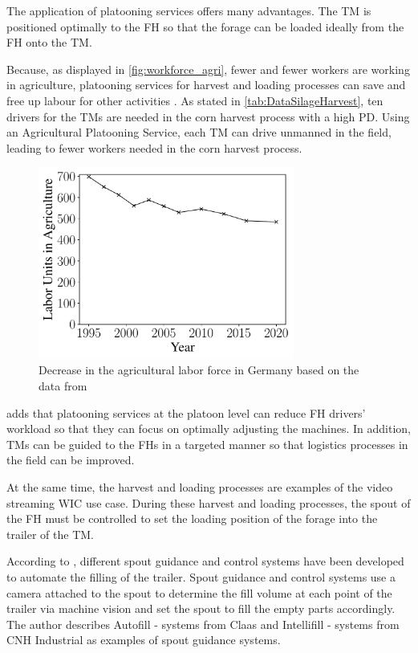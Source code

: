 The application of platooning services offers many advantages.
The \ac{TM} is positioned optimally to the \ac{FH} so that the forage can be loaded ideally from the \ac{FH} onto the \ac{TM}.

Because, as displayed in \autoref{fig:workforce_agri}, fewer and fewer workers are working in agriculture, platooning services for harvest and loading processes can save and free up labour for other activities \cite{liu_automation_2022}. As stated in \autoref{tab:DataSilageHarvest}, ten drivers for the \ac{TM}s are needed in the corn harvest process with a high \ac{PD}. Using an Agricultural Platooning Service, each \ac{TM} can drive unmanned in the field, leading to fewer workers needed in the corn harvest process.

\begin{figure}[H]
   \centering
   \includegraphics[width=0.75\textwidth]{figures/WorkForceAgriculture.pdf}
   \caption{Decrease in the agricultural labor force in Germany based on the data from \cite{bmel2020}}%
   \label{fig:workforce_agri}%
\end{figure}
\textcite{smolnik_5g_2020} adds that platooning services at the platoon level can reduce \ac{FH} drivers' workload so that they can focus on optimally adjusting the machines.
In addition, \ac{TM}s can be guided to the \ac{FH}s in a targeted manner so that logistics processes in the field can be improved.

At the same time, the harvest and loading processes are examples of the video streaming \ac{WIC} use case.
During these harvest and loading processes, the spout of the \ac{FH} must be controlled to set the loading position of the forage into the trailer of the \ac{TM}.

According to \textcite{murcia_quadrotor_2014}, different spout guidance and control systems have been developed to automate the filling of the trailer. Spout guidance and control systems use a camera attached to the spout to determine the fill volume at each point of the trailer via machine vision and set the spout to fill the empty parts accordingly. The author describes Autofill - systems from Claas and Intellifill - systems from CNH Industrial as examples of spout guidance systems.


